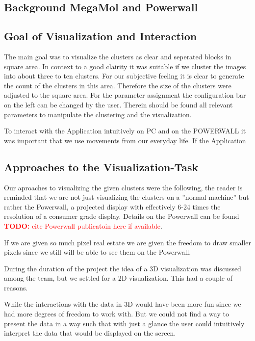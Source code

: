 \documentclass[journal]{vgtc}       %
\newcommand{\todo}[1]{\textcolor{red}{\textbf{TODO:} #1}}
\begin{document}
\subsection{Background MegaMol and Powerwall}





\subsection{Goal of Visualization and Interaction}
The main goal was to visualize the clusters as clear and seperated blocks in square area. In context to a good clairity it was suitable if we cluster the images into about three to ten clusters. For our subjective feeling it is clear to generate the count of the clusters in this area. Therefore the size of the clusters were adjusted to the square area. For the parameter assignment the configuration bar on the left can be changed by the user. Therein should be found all relevant parameters to manipulate the clustering and the visualization.

To interact with the Application intuitively on PC and on the POWERWALL it was important that we use movements from our everyday life. If the Application 




\subsection{Approaches to the Visualization-Task}

Our aproaches to visualizing the given clusters were the following, the reader is reminded that we are not just visualizing the clusters on a ''normal machine'' but rather the Powerwall, a projected display with effectively 6-24 times the resolution of a consumer grade display. Details on the Powerwall can be found \todo{cite Powerwall publicatoin here if available}. \cite{Powerwall}

If we are given so much pixel real estate we are given the freedom to draw smaller pixels since we still will be able to see them on the Powerwall.

During the duration of the project the idea of a 3D visualization was discussed among the team, but we settled for a 2D visualization. This had a couple of reasons.

While the interactions with the data in 3D would have been more fun since we had more degrees of freedom to work with.
But we could not find a way to present the data in a way such that with just a glance the user could intuitively interpret the data that would be displayed on the screen.
\end{document}
